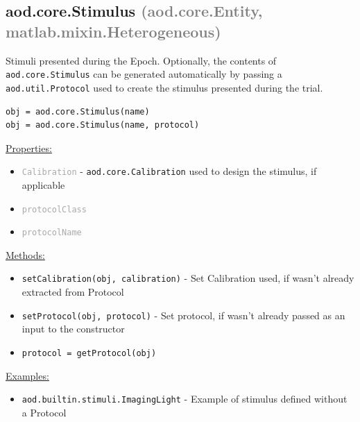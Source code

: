 \documentclass[10pt]{exam}
\newcommand\myparent[1]{\textcolor{gray}{(#1)}}
\newcommand\aodclass[1]{\textcolor{codeblue}{\texttt{#1}}}
\newcommand\aodprop[1]{\textcolor{darkgray}{\texttt{#1}}}
\newcommand\aodfcn[1]{\textcolor{darkteal}{\texttt{#1}}}
\newcommand\docheader[1]{\vspace{0.6ex}\noindent\underline{#1}\vspace{0.15ex}}
\begin{document}
	\subsection{aod.core.Stimulus \myparent{aod.core.Entity, matlab.mixin.Heterogeneous}}
		\noindent Stimuli presented during the Epoch. Optionally, the contents of \aodclass{aod.core.Stimulus} can be generated automatically by passing a \aodclass{aod.util.Protocol} used to create the stimulus presented during the trial.
		\begin{lstlisting}
obj = aod.core.Stimulus(name)
obj = aod.core.Stimulus(name, protocol)
		\end{lstlisting}
		\docheader{Properties:}
		\begin{itemize}
			\item \aodprop{Calibration} - \aodclass{aod.core.Calibration} used to design the stimulus, if applicable
			\item \aodprop{protocolClass}
			\item \aodprop{protocolName}
		\end{itemize}
		\docheader{Methods:}
		\begin{itemize}
			\item \aodfcn{setCalibration(obj, calibration)} - Set Calibration used, if wasn't already extracted from Protocol
			\item \aodfcn{setProtocol(obj, protocol)} - Set protocol, if wasn't already passed as an input to the constructor
			\item \aodfcn{protocol = getProtocol(obj)}
		\end{itemize}
		\docheader{Examples:}
		\begin{itemize}
			\item \aodclass{aod.builtin.stimuli.ImagingLight} - Example of stimulus defined without a Protocol
		\end{itemize}
	
\end{document}
